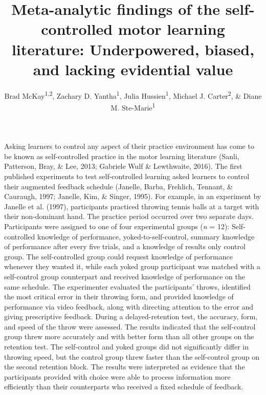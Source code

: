 \documentclass[
  english,
  man, donotrepeattitle,floatsintext]{apa7}
\title{Meta-analytic findings of the self-controlled motor learning literature: Underpowered, biased, and lacking evidential value}
\author{Brad McKay\textsuperscript{1,2}, Zachary D. Yantha\textsuperscript{1}, Julia Hussien\textsuperscript{1}, Michael J. Carter\textsuperscript{2}, \& Diane M. Ste-Marie\textsuperscript{1}}
\date{}
\affiliation{\vspace{0.5cm}\textsuperscript{1} School of Human Kinetics, University of Ottawa\\\textsuperscript{2} Department of Kinesiology, McMaster University}
\begin{document}
\maketitle

Asking learners to control any aspect of their practice environment has come to be known as self-controlled practice in the motor learning literature (Sanli, Patterson, Bray, \& Lee, 2013; Gabriele Wulf \& Lewthwaite, 2016). The first published experiments to test self-controlled learning asked learners to control their augmented feedback schedule (Janelle, Barba, Frehlich, Tennant, \& Cauraugh, 1997; Janelle, Kim, \& Singer, 1995). For example, in an experiment by Janelle et al. (1997), participants practiced throwing tennis balls at a target with their non-dominant hand. The practice period occurred over two separate days. Participants were assigned to one of four experimental groups (\emph{n} = 12): Self-controlled knowledge of performance, yoked-to-self-control, summary knowledge of performance after every five trials, and a knowledge of results only control group. The self-controlled group could request knowledge of performance whenever they wanted it, while each yoked group participant was matched with a self-control group counterpart and received knowledge of performance on the same schedule. The experimenter evaluated the participants' throws, identified the most critical error in their throwing form, and provided knowledge of performance via video feedback, along with directing attention to the error and giving prescriptive feedback. During a delayed-retention test, the accuracy, form, and speed of the throw were assessed. The results indicated that the self-control group threw more accurately and with better form than all other groups on the retention test. The self-control and yoked groups did not significantly differ in throwing speed, but the control group threw faster than the self-control group on the second retention block. The results were interpreted as evidence that the participants provided with choice were able to process information more efficiently than their counterparts who received a fixed schedule of feedback.
\end{document}

